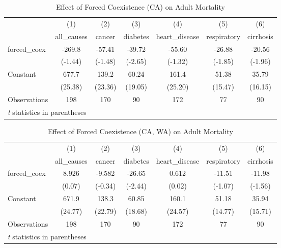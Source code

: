 \documentclass[12pt]{article}
\begin{document}
\begin{table}[htbp]\centering \caption{Effect of Forced Coexistence (CA) on Adult Mortality\label{adult1}} \begin{tabular}{l*{6}{c}} \toprule
                    &\multicolumn{1}{c}{(1)}&\multicolumn{1}{c}{(2)}&\multicolumn{1}{c}{(3)}&\multicolumn{1}{c}{(4)}&\multicolumn{1}{c}{(5)}&\multicolumn{1}{c}{(6)}\\
                    &\multicolumn{1}{c}{all\_causes}&\multicolumn{1}{c}{cancer}&\multicolumn{1}{c}{diabetes}&\multicolumn{1}{c}{heart\_disease}&\multicolumn{1}{c}{respiratory}&\multicolumn{1}{c}{cirrhosis}\\
\midrule
forced\_coex         &      -269.8&      -57.41&      -39.72&      -55.60&      -26.88&      -20.56\\
                    &     (-1.44)&     (-1.48)&     (-2.65)&     (-1.32)&     (-1.85)&     (-1.96)\\
\addlinespace
Constant            &       677.7&       139.2&       60.24&       161.4&       51.38&       35.79\\
                    &     (25.38)&     (23.36)&     (19.05)&     (25.20)&     (15.47)&     (16.15)\\
\midrule
Observations        &         198&         170&          90&         172&          77&          90\\
\bottomrule
\multicolumn{7}{l}{\footnotesize \textit{t} statistics in parentheses}\\
\end{tabular}
\end{table}

\begin{table}[htbp]\centering \caption{Effect of Forced Coexistence (CA, WA) on Adult Mortality\label{adult2}} \begin{tabular}{l*{6}{c}} \toprule
                    &\multicolumn{1}{c}{(1)}&\multicolumn{1}{c}{(2)}&\multicolumn{1}{c}{(3)}&\multicolumn{1}{c}{(4)}&\multicolumn{1}{c}{(5)}&\multicolumn{1}{c}{(6)}\\
                    &\multicolumn{1}{c}{all\_causes}&\multicolumn{1}{c}{cancer}&\multicolumn{1}{c}{diabetes}&\multicolumn{1}{c}{heart\_disease}&\multicolumn{1}{c}{respiratory}&\multicolumn{1}{c}{cirrhosis}\\
\midrule
forced\_coex         &       8.926&      -9.582&      -26.65&       0.612&      -11.51&      -11.98\\
                    &      (0.07)&     (-0.34)&     (-2.44)&      (0.02)&     (-1.07)&     (-1.56)\\
\addlinespace
Constant            &       671.9&       138.3&       60.85&       160.1&       51.18&       35.94\\
                    &     (24.77)&     (22.79)&     (18.68)&     (24.57)&     (14.77)&     (15.71)\\
\midrule
Observations        &         198&         170&          90&         172&          77&          90\\
\bottomrule
\multicolumn{7}{l}{\footnotesize \textit{t} statistics in parentheses}\\
\end{tabular}
\end{table}
\end{document}

